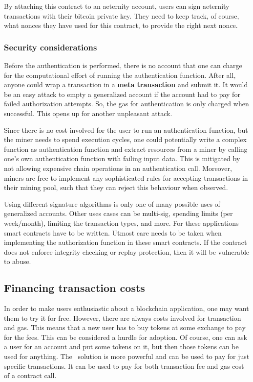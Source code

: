 By attaching this contract to an aeternity account, users can sign
aeternity transactions with their bitcoin private key. They need to
keep track, of course, what nonces they have used for this contract,
to provide the right next nonce.

\subsubsection{Security considerations}

Before the authentication is performed, there is no account that one
can charge for the computational effort of running the authentication
function. After all, anyone could wrap a transaction in a \textbf{meta
  transaction} and submit it. It would be an easy attack to empty a
generalized account if the account had to pay for failed authorization
attempts. So, the gas for authentication is only charged when
successful. This opens up for another unpleasant attack.

Since there is no cost involved for the user to run an authentication
function, but the miner needs to spend execution cycles, one could
potentially write a complex function as authentication function and
extract resources from a miner by calling one's own authentication
function with failing input data. This is mitigated by not allowing
expensive chain operations in an authentication call. Moreover, miners
are free to implement any sophisticated rules for accepting
transactions in their mining pool, such that they can reject this
behaviour when observed.

Using different signature algorithms is only one of many possible uses
of generalized accounts. Other uses cases can be multi-sig, spending
limits (per week/month), limiting the transaction types, and more. For
these applications smart contracts have to be written. Utmost care
needs to be taken when implementing the authorization
function in these smart contracts. If the contract does not enforce
integrity checking or replay protection, then it will be vulnerable to
abuse.


\subsection{Financing transaction costs}
\label{sect:payingfor}

In order to make users enthusiastic about a blockchain application,
one may want them to try it for free. However, there are always costs
involved for transaction and gas. This means that a new user has to
buy tokens at some exchange to pay for the fees. This can be considered
a hurdle for adoption. Of course, one can ask a user for an account and put
some tokens on it, but then those tokens can be used for anything.
The \aet\ solution is more powerful and can be used to pay for
just specific transactions. It can be used to pay for both transaction
fee and gas cost of a contract call.

